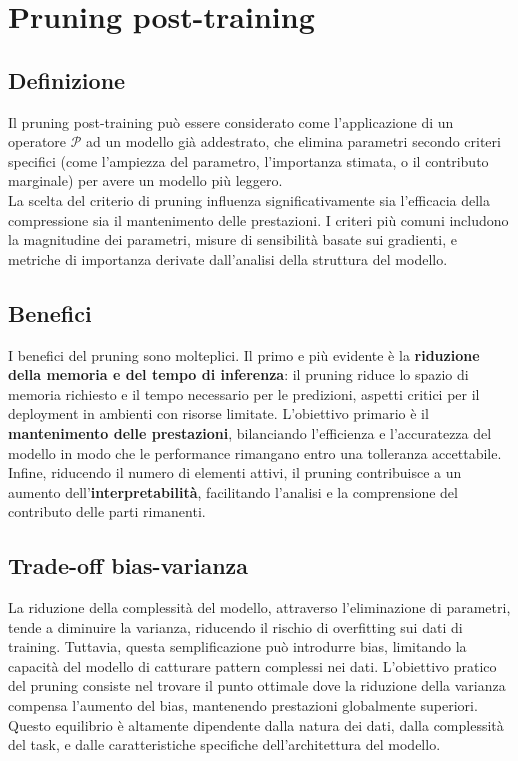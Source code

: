 \documentclass[a4paper,12pt]{report}
\begin{document}
	\section{Pruning post-training}
	
	\subsection{Definizione}
	Il pruning post-training può essere considerato come l'applicazione di un operatore $\mathcal{P}$ ad un modello già addestrato, che elimina parametri secondo criteri specifici (come l'ampiezza del parametro, l'importanza stimata, o il contributo marginale) per avere un modello più leggero. \\
	La scelta del criterio di pruning influenza significativamente sia l'efficacia della compressione sia il mantenimento delle prestazioni. I criteri più comuni includono la magnitudine dei parametri, misure di sensibilità basate sui gradienti, e metriche di importanza derivate dall'analisi della struttura del modello.
	
	\subsection{Benefici}
	I benefici del pruning sono molteplici. Il primo e più evidente è la \textbf{riduzione della memoria e del tempo di inferenza}: il pruning riduce lo spazio di memoria richiesto e il tempo necessario per le predizioni, aspetti critici per il deployment in ambienti con risorse limitate. L'obiettivo primario è il \textbf{mantenimento delle prestazioni}, bilanciando l'efficienza e l'accuratezza del modello in modo che le performance rimangano entro una tolleranza accettabile. Infine, riducendo il numero di elementi attivi, il pruning contribuisce a un aumento dell'\textbf{interpretabilità}, facilitando l'analisi e la comprensione del contributo delle parti rimanenti.
	
	\subsection{Trade-off bias-varianza}
	La riduzione della complessità del modello, attraverso l'eliminazione di parametri, tende a diminuire la varianza, riducendo il rischio di overfitting sui dati di training. Tuttavia, questa semplificazione può introdurre bias, limitando la capacità del modello di catturare pattern complessi nei dati. L'obiettivo pratico del pruning consiste nel trovare il punto ottimale dove la riduzione della varianza compensa l'aumento del bias, mantenendo prestazioni globalmente superiori. Questo equilibrio è altamente dipendente dalla natura dei dati, dalla complessità del task, e dalle caratteristiche specifiche dell'architettura del modello.
	
\end{document}
